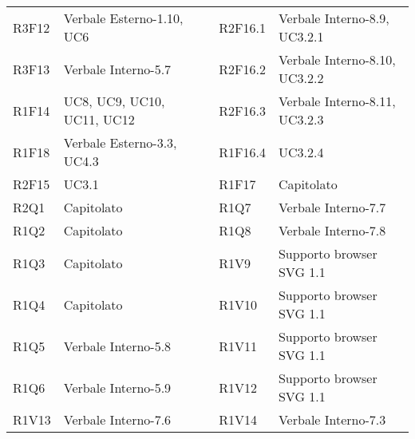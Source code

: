 \begin{center}
\begin{longtable}{C{2cm} | C{5cm} C{0.2cm} C{2cm} | C{5cm}}
R3F12 & Verbale Esterno-1.10, UC6 &  & R2F16.1 & Verbale Interno-8.9, UC3.2.1 \\
R3F13 & Verbale Interno-5.7 &  & R2F16.2 & Verbale Interno-8.10, UC3.2.2 \\
R1F14 & UC8, UC9, UC10, UC11, UC12 &  & R2F16.3 & Verbale Interno-8.11, UC3.2.3 \\
R1F18 & Verbale Esterno-3.3, UC4.3 &  & R1F16.4 & UC3.2.4 \\
R2F15 & UC3.1 &  & R1F17 & Capitolato \\

R2Q1 & Capitolato &  & R1Q7 & Verbale Interno-7.7\\
R1Q2 & Capitolato &  & R1Q8 & Verbale Interno-7.8\\
R1Q3 & Capitolato &  & R1V9 & Supporto browser SVG 1.1\\
R1Q4 & Capitolato &  & R1V10 & Supporto browser SVG 1.1\\
R1Q5 & Verbale Interno-5.8 &  & R1V11 & Supporto browser SVG 1.1\\
R1Q6 & Verbale Interno-5.9 &  & R1V12 & Supporto browser SVG 1.1\\
R1V13 & Verbale Interno-7.6 &  & R1V14 & Verbale Interno-7.3\\
\end{longtable}
\end{center}

























